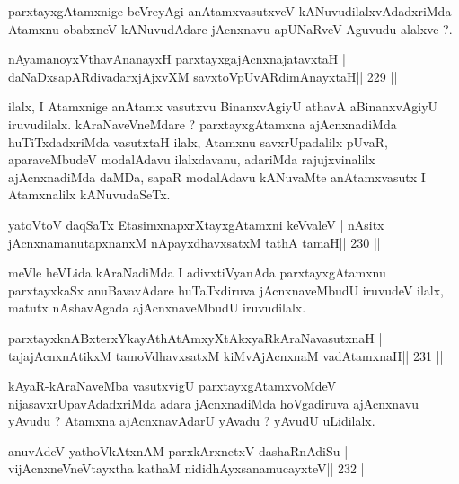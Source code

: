 \begin{artha}
parxtayxgAtamxnige beVreyAgi anAtamxvasutxveV kANuvudilalxvAdadxriMda Atamxnu obabxneV kANuvudAdare jAcnxnavu apUNaRveV Aguvudu alalxve ?.
\end{artha}


\begin{shl}
nAyamanoyxV\s thavA\s nanayxH parxtayxgajAcnxnajatavxtaH |
daNaDxsapARdivadarxjAjxvXM savxtoV\s pUvARdimAnayxtaH\hfill || 229 ||
\end{shl}

\begin{artha}
ilalx, I Atamxnige anAtamx vasutxvu BinanxvAgiyU athavA aBinanxvAgiyU iruvudilalx. kAraNaveVneMdare ? parxtayxgAtamxna ajAcnxnadiMda huTiTxdadxriMda vasutxtaH ilalx, Atamxnu savxrUpadalilx pUvaR, aparaveMbudeV modalAdavu ilalxdavanu, adariMda rajujxvinalilx ajAcnxnadiMda daMDa, sapaR modalAdavu kANuvaMte anAtamxvasutx I Atamxnalilx kANuvudaSeTx.
\end{artha}

\begin{shl}
yatoV\s toV daqSaTx EtasimxnapxrXtayxgAtamxni keVvaleV |
nAsitx jAcnxnamanutapxnanxM nApayxdhavxsatxM tathA tamaH\hfill || 230 ||
\end{shl}

\begin{artha}
meVle heVLida kAraNadiMda I adivxtiVyanAda parxtayxgAtamxnu parxtayxkaSx anuBavavAdare \footnotemark[1]huTaTxdiruva jAcnxnaveMbudU iruvudeV ilalx, matutx nAshavAgada ajAcnxnaveMbudU iruvudilalx.
\end{artha}

\begin{shl}
parxtayxknABxterxYkayAthAtAmxyXtAkxyaRkAraNavasutxnaH |
tajajAcnxnAtikxM tamoV\s dhavxsatxM kiMvA\s jAcnxnaM vadA\s\s tamxnaH\hfill || 231 ||
\end{shl}

\begin{artha}
kAyaR-kAraNaveMba vasutxvigU parxtayxgAtamxvoMdeV nijasavxrUpavAdadxriMda adara jAcnxnadiMda hoVgadiruva ajAcnxnavu yAvudu ? Atamxna ajAcnxnavAdarU yAvadu ? yAvudU uLidilalx.
\end{artha}


\begin{shl}
anuvAdeV yathoVkAtxnAM parxkArxnetxV dashaRnAdiSu |
vijAcnxneVneVtayxtha kathaM nididhAyxsanamucayxteV\hfill || 232 ||
\end{shl}

